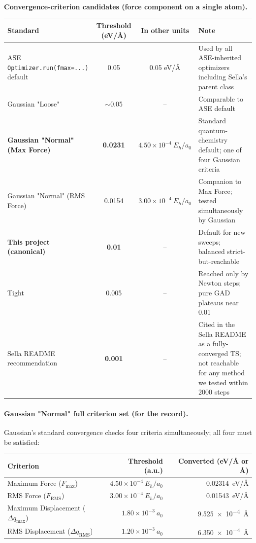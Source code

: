 \documentclass[11pt]{article}
\begin{document}
\begin{center}\small
\textbf{Convergence-criterion candidates (force component on a single atom).}\\[0.4em]
\begin{tabular}{l|c|c|p{}}
\toprule
\textbf{Standard} & \textbf{Threshold (eV/Å)} & \textbf{In other units} & \textbf{Note} \\
\midrule
ASE \texttt{Optimizer.run(fmax=...)} default      & 0.05    & 0.05 eV/Å              & Used by all ASE-inherited optimizers including Sella's parent class \\
Gaussian "Loose"                                   & $\sim$0.05  & --                 & Comparable to ASE default \\
\textbf{Gaussian "Normal" (Max Force)}             & \textbf{0.0231} & $4.50\times10^{-4}~E_h/a_0$ & Standard quantum-chemistry default; one of four Gaussian criteria \\
Gaussian "Normal" (RMS Force)                      & 0.0154  & $3.00\times10^{-4}~E_h/a_0$ & Companion to Max Force; tested simultaneously by Gaussian \\
\textbf{This project (canonical)}                  & \textbf{0.01}   & --                  & Default for new sweeps; balanced strict-but-reachable \\
Tight                                              & 0.005   & --                  & Reached only by Newton steps; pure GAD plateaus near 0.01 \\
Sella README recommendation                        & \textbf{0.001}  & --                  & Cited in the Sella README as a fully-converged TS; not reachable for any method we tested within 2000 steps \\
\bottomrule
\end{tabular}
\end{center}

\paragraph{Gaussian "Normal" full criterion set (for the record).}
Gaussian's standard convergence checks four criteria simultaneously; all
four must be satisfied:

\begin{center}\footnotesize
\begin{tabular}{l|r|r}
\toprule
\textbf{Criterion} & \textbf{Threshold (a.u.)} & \textbf{Converted (eV/Å or Å)} \\
\midrule
Maximum Force ($F_\text{max}$)                     & $4.50\times10^{-4}~E_h/a_0$ & \SI{0.02314}{eV/\angstrom} \\
RMS Force ($F_\text{RMS}$)                         & $3.00\times10^{-4}~E_h/a_0$ & \SI{0.01543}{eV/\angstrom} \\
Maximum Displacement ($\Delta q_\text{max}$)       & $1.80\times10^{-3}~a_0$     & \SI{9.525e-4}{\angstrom}   \\
RMS Displacement ($\Delta q_\text{RMS}$)           & $1.20\times10^{-3}~a_0$     & \SI{6.350e-4}{\angstrom}   \\
\bottomrule
\end{tabular}
\end{center}
\end{document}
